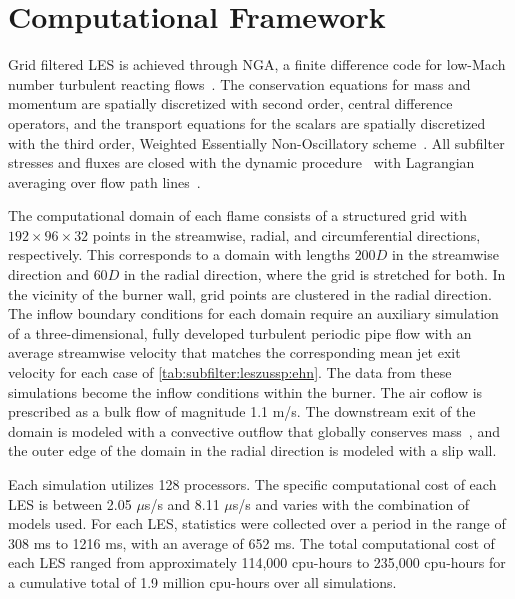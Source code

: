 \section{Computational Framework}
\label{sec:lesresults:comput}

Grid filtered LES is achieved through NGA, a finite difference code for low-Mach number turbulent reacting flows~\cite{desjardins2008}. The conservation equations for mass and momentum are spatially discretized with second order, central difference operators, and the transport equations for the scalars are spatially discretized with the third order, Weighted Essentially Non-Oscillatory scheme~\cite{jiang1996}. All subfilter stresses and fluxes are closed with the dynamic procedure~\cite{germano1991,lilly1992,moin1991} with Lagrangian averaging over flow path lines~\cite{meneveau1996,reveillon1996}.

The computational domain of each flame consists of a structured grid with $192 \times 96 \times 32$ points in the streamwise, radial, and circumferential directions, respectively. This corresponds to a domain with lengths $200D$ in the streamwise direction and $60D$ in the radial direction, where the grid is stretched for both. In the vicinity of the burner wall, grid points are clustered in the radial direction. The inflow boundary conditions for each domain require an auxiliary simulation of a three-dimensional, fully developed turbulent periodic pipe flow with an average streamwise velocity that matches the corresponding mean jet exit velocity for each case of \cref{tab:subfilter:leszussp:ehn}. The data from these simulations become the inflow conditions within the burner. The air coflow is prescribed as a bulk flow of magnitude 1.1 m/s. The downstream exit of the domain is modeled with a convective outflow that globally conserves mass~\cite{akselvoll1996}, and the outer edge of the domain in the radial direction is modeled with a slip wall.

Each simulation utilizes 128 processors. The specific computational cost of each LES is between 2.05 $\mu$s/s and 8.11 $\mu$s/s and varies with the combination of models used. For each LES, statistics were collected over a period in the range of 308 ms to 1216 ms, with an average of 652 ms. The total computational cost of each LES ranged from approximately 114,000 cpu-hours to 235,000 cpu-hours for a cumulative total of 1.9 million cpu-hours over all simulations. %

